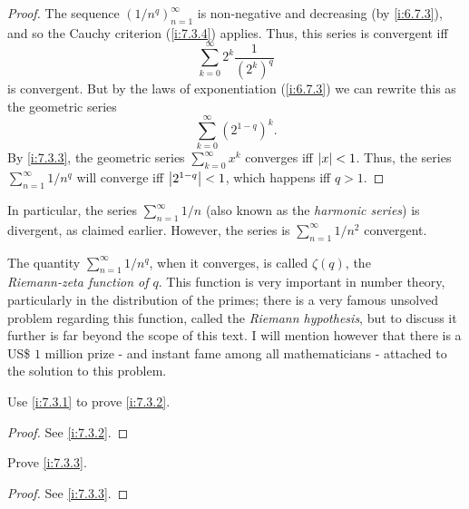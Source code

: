 \begin{proof}
  The sequence \((1 / n^q)_{n = 1}^\infty\) is non-negative and decreasing (by \cref{i:6.7.3}), and so the Cauchy criterion (\cref{i:7.3.4}) applies.
  Thus, this series is convergent iff
  \[
    \sum_{k = 0}^\infty 2^k \dfrac{1}{(2^k)^q}
  \]
  is convergent.
  But by the laws of exponentiation (\cref{i:6.7.3}) we can rewrite this as the geometric series
  \[
    \sum_{k = 0}^\infty (2^{1 - q})^k.
  \]
  By \cref{i:7.3.3}, the geometric series \(\sum_{k = 0}^\infty x^k\) converges iff \(\left\lvert x\right\rvert < 1\).
  Thus, the series \(\sum_{n = 1}^\infty 1 / n^q\) will converge iff \(\left\lvert2^{1 - q}\right\rvert < 1\), which happens iff \(q > 1\).
\end{proof}

\begin{note}
  In particular, the series \(\sum_{n = 1}^\infty 1 / n\) (also known as the \emph{harmonic series}) is divergent, as claimed earlier.
  However, the series is \(\sum_{n = 1}^\infty 1 / n^2\) convergent.
\end{note}

\begin{rmk}\label{i:7.3.8}
  The quantity \(\sum_{n = 1}^\infty 1 / n^q\), when it converges, is called \(\zeta(q)\), the \\
  \emph{Riemann-zeta function of \(q\)}.
  This function is very important in number theory, particularly in the distribution of the primes;
  there is a very famous unsolved problem regarding this function, called the \emph{Riemann hypothesis}, but to discuss it further is far beyond the scope of this text.
  I will mention however that there is a US\$ \(1\) million prize
  - and instant fame among all mathematicians -
  attached to the solution to this problem.
\end{rmk}

\exercisesection

\begin{ex}\label{i:ex:7.3.1}
  Use \cref{i:7.3.1} to prove \cref{i:7.3.2}.
\end{ex}

\begin{proof}
  See \cref{i:7.3.2}.
\end{proof}

\begin{ex}\label{i:ex:7.3.2}
  Prove \cref{i:7.3.3}.
\end{ex}

\begin{proof}
  See \cref{i:7.3.3}.
\end{proof}

